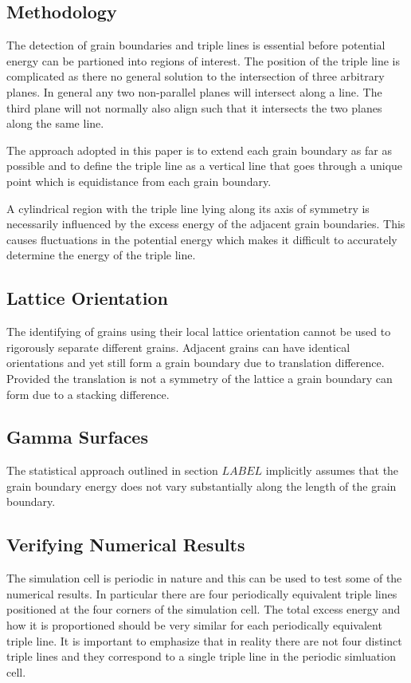 \documentclass[12pt,a4paper]{book}
\begin{document}
\subsection{Methodology}

The detection of grain boundaries and triple lines is essential before potential energy can be partioned into regions of interest. The position of the triple line is complicated as there no general solution to the intersection of three arbitrary planes. In general any two non-parallel planes will intersect along a line. The third plane will not normally also align such that it intersects the two planes along the same line.

The approach adopted in this paper is to extend each grain boundary as far as possible and to define the triple line as a vertical line that goes through a unique point which is equidistance from each grain boundary. 

A cylindrical region with the triple line lying along its axis of symmetry is necessarily influenced by the excess energy of the adjacent grain boundaries. This causes fluctuations in the potential energy which makes it difficult to accurately determine the energy of the triple line.
\subsection{Lattice Orientation}

The identifying of grains using their local lattice orientation cannot be used to rigorously separate different grains. Adjacent grains can have identical orientations and yet still form a grain boundary due to translation difference. Provided the translation is not a symmetry of the lattice a grain boundary can form due to a stacking difference.

\subsection{Gamma Surfaces}

The statistical approach outlined in section $LABEL$ implicitly assumes that the grain boundary energy does not vary substantially along the length of the grain boundary.

\subsection{Verifying Numerical Results}

The simulation cell is periodic in nature and this can be used to test some of the numerical results. In particular there are four periodically equivalent triple lines positioned at the four corners of the simulation cell. The total excess energy and how it is proportioned should be very similar for each periodically equivalent triple line. It is important to emphasize that in reality there are not four distinct triple lines and they correspond to a single triple line in the periodic simluation cell.
\end{document}
